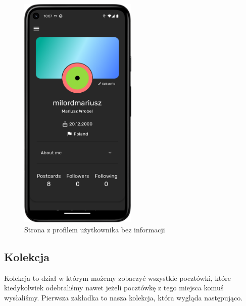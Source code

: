 \documentclass[a4paper,twoside,12pt]{book}
\begin{document}
\begin{figure}[H]
    \centering
    \includegraphics[width=0.5\textwidth]{mobile_ss/profil_z_info.png}
    \caption{Strona z profilem użytkownika bez informacji}
\end{figure}
\newpage
\subsection{Kolekcja}
Kolekcja to dział w którym możemy zobaczyć wszystkie pocztówki, które kiedykolwiek odebraliśmy nawet jeżeli pocztówkę z tego miejsca komuś wysłaliśmy. Pierwsza zakładka to nasza kolekcja, która wygląda następująco. 
\end{document}
